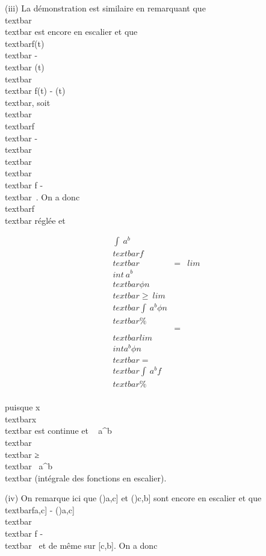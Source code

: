 (iii) La démonstration est similaire en remarquant que
\\textbar{}\phin\\textbar{} est
encore en escalier et que
\textbar{}\\textbar{}f(t)\\textbar{}
-\\textbar{}
\phin(t)\\textbar{}\textbar{}\leq\\textbar{}
f(t) - \phin(t)\\textbar{}, soit
\\textbar{}\\textbar{}f\\textbar{}
-\\textbar{}
\phin\\textbar{}\\textbar{}\infty~
\leq\\textbar{} f - \phin\\textbar{}\infty~.
On a donc \\textbar{}f\\textbar{} réglée
et

\begin{align*} \int ~
a^b\\textbar{}f\\textbar{}&
=& lim\\int ~
a^b\\textbar{}\phi
n\\textbar{} ≥\
lim\\textbar{}\int ~
a^b\phi n\\textbar{}\%&
\\ & =&
\\textbar{}lim~\\int
 a^b\phi n\\textbar{}
=\\textbar{}\int ~
a^bf\\textbar{} \%&
\\ \end{align*}

puisque
x\mapsto~\\textbar{}x\\textbar{}
est continue et \int ~
a^b\\textbar{}\phin\\textbar{}
≥\\textbar{}\int ~
a^b\phin\\textbar{} (intégrale des
fonctions en escalier).

(iv) On remarque ici que
(\phin)\textbar{}{[}a,c{]} et
(\phin)\textbar{}{[}c,b{]} sont encore en
escalier et que
\\textbar{}f\textbar{}{[}a,c{]} -
(\phin)\textbar{}{[}a,c{]}\\textbar{}\infty~
\leq\\textbar{} f - \phin\\textbar{}\infty~
et de même sur {[}c,b{]}. On a donc


